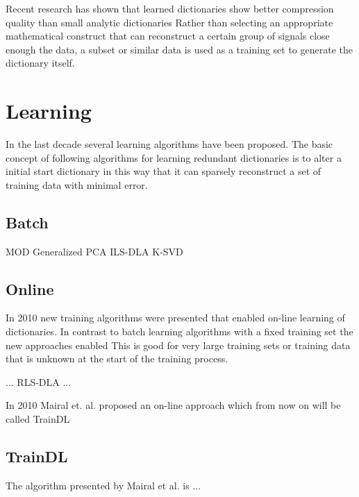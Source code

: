 Recent research has shown that learned dictionaries show better compression quality than small analytic dictionaries \cite{Chen1998} \cite{Aharon2006} \cite{Mairal2010}
Rather than selecting an appropriate mathematical construct that can reconstruct a certain group of signals close enough the data, a subset or similar data
is used as a training set to generate the dictionary itself.




\section{Learning}
In the last decade several learning algorithms have been proposed.
The basic concept of following algorithms for learning redundant dictionaries is to alter a initial start dictionary
in this way that it can sparsely reconstruct a set of training data with minimal error. 

\subsection{Batch}
MOD \cite{Engan1999}
Generalized PCA \cite{}
ILS-DLA \cite{}
K-SVD \cite{Aharon2006}


\subsection{Online}
In 2010 new training algorithms were presented that enabled on-line learning of dictionaries. 
In contrast to batch learning algorithms with a fixed training set the new approaches enabled
This is good for very large training sets or training data that is unknown at the start of the training process.

... RLS-DLA \cite{Engan2010} ...


In 2010 Mairal et. al. \cite{Mairal2010} proposed an on-line approach which from now on will be called TrainDL

\subsection{TrainDL}
\label{sec:mairal}
The algorithm presented by Mairal et al. \cite{Mairal2010} is ...

